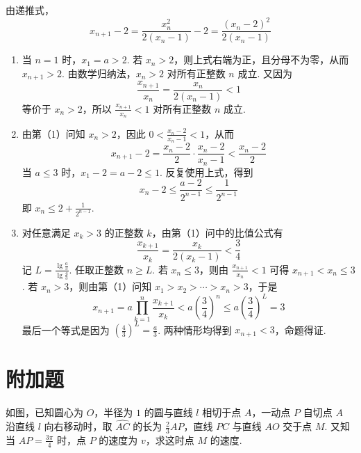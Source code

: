 \begin{solution}
由递推式，
\[
x_{n+1}-2=\frac{x_n^2}{2(x_n-1)}-2=\frac{(x_n-2)^2}{2(x_n-1)}
\]

\begin{enumerate}
\item 当 \(n=1\) 时，\(x_1=a>2\). 若 \(x_n>2\)，则上式右端为正，且分母不为零，从而 \(x_{n+1}>2\). 由数学归纳法，\(x_n>2\) 对所有正整数 \(n\) 成立. 又因为
\[
\frac{x_{n+1}}{x_n}=\frac{x_n}{2(x_n-1)}<1
\]
等价于 \(x_n>2\)，所以 \(\frac{x_{n+1}}{x_n}<1\) 对所有正整数 \(n\) 成立.
\item 由第（1）问知 \(x_n>2\)，因此 \(0<\frac{x_n-2}{x_n-1}<1\)，从而
\[
x_{n+1}-2=\frac{x_n-2}{2}\cdot\frac{x_n-2}{x_n-1}<\frac{x_n-2}{2}
\]
当 \(a\leqslant3\) 时，\(x_1-2=a-2\leqslant1\). 反复使用上式，得到
\[
x_n-2\leqslant\frac{a-2}{2^{n-1}}\leqslant\frac{1}{2^{n-1}}
\]
即 \(x_n\leqslant2+\frac{1}{2^{n-1}}\).
\item 对任意满足 \(x_k>3\) 的正整数 \(k\)，由第（1）问中的比值公式有
\[
\frac{x_{k+1}}{x_k}=\frac{x_k}{2(x_k-1)}<\frac34
\]
记 \(L=\frac{\lg\frac{a}{3}}{\lg\frac43}\). 任取正整数 \(n\geqslant L\). 若 \(x_n\leqslant3\)，则由 \(\frac{x_{n+1}}{x_n}<1\) 可得 \(x_{n+1}<x_n\leqslant3\). 若 \(x_n>3\)，则由第（1）问知 \(x_1>x_2>\cdots>x_n>3\)，于是
\[
x_{n+1}=a\prod_{k=1}^{n}\frac{x_{k+1}}{x_k}<a\left(\frac34\right)^n\leqslant a\left(\frac34\right)^L=3
\]
最后一个等式是因为 \(\left(\frac43\right)^L=\frac{a}{3}\). 两种情形均得到 \(x_{n+1}<3\)，命题得证.
\end{enumerate}
\end{solution}

\section{附加题}

\begin{problem}

如图，已知圆心为 \(O\)，半径为 \(1\) 的圆与直线 \(l\) 相切于点 \(A\)，一动点 \(P\) 自切点 \(A\) 沿直线 \(l\) 向右移动时，取 \(\widehat{AC}\) 的长为 \(\frac{2}{3} AP\)，直线 \(PC\) 与直线 \(AO\) 交于点 \(M\). 又知当 \(AP = \frac{3\pi}{4}\) 时，点 \(P\) 的速度为 \(v\)，求这时点 \(M\) 的速度.

\FloatBarrier
\end{problem}

